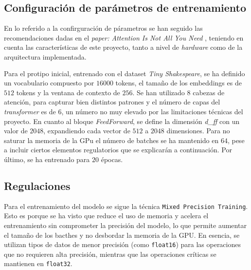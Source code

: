 \documentclass[11pt]{book}
\theoremstyle{plain}
\theoremstyle{definition}
\begin{document}
\subsection{Configuración de parámetros de entrenamiento}

En lo referido a la confirguración de párametros se han seguido las recomendaciones dadas en el \textit{paper: Attention Is Not All You Need} \parencite{gerber2025ffn}, teniendo en cuenta las características de este proyecto, tanto a nivel de  \textit{hardware} como de la arquitectura implementada.

Para el protipo inicial, entrenado con el dataset \textit{Tiny Shakespeare}, se ha definido un vocabulario compuesto por $16000$ tokens, el tamaño de los embeddings es de $512$ tokens y la ventana de contexto de $256$. Se han utilizado $8$ cabezas de atención, para capturar bien distintos patrones y el número de capas del \textit{transformer} es de $6$, un número no muy elevado por las limitaciones técnicas del proyecto. En cuanto al bloque \textit{FeedForward}, se define la dimensión \textit{d\_ff} con un valor de $2048$, expandiendo cada vector de $512$ a $2048$ dimensiones. Para no saturar la memoria de la GPu el número de batches se ha mantenido en $64$, pese a incluir ciertos elementos regulatorios que se explicarán a continuación. Por último, se ha entrenado para $20$ épocas.


\subsection{Regulaciones}

Para el entrenamiento del modelo se sigue la técnica \texttt{Mixed Precision Training}. Esto es porque se ha visto que reduce el uso de memoria y acelera el entrenamiento sin comprometer la precisión del modelo, lo que permite aumentar el tamaño de los bacthes y no desbordar la memoria de la GPU. En esencia, se utilizan tipos de datos de menor precisión (como \texttt{float16}) para las operaciones que no requieren alta precisión, mientras que las operaciones críticas se mantienen en \texttt{float32}. 
\end{document}
